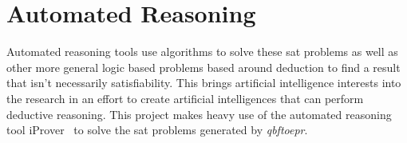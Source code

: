 \section{Automated Reasoning}
Automated reasoning tools use algorithms to solve these \gls{sat} problems as well as other more general logic based problems based around deduction to find a result that isn't necessarily satisfiability. This brings artificial intelligence interests into the research in an effort to create artificial intelligences that can perform deductive reasoning. This project makes heavy use of the automated reasoning tool iProver~\cite{iprover} to solve the \gls{sat} problems generated by \textit{qbftoepr}.
